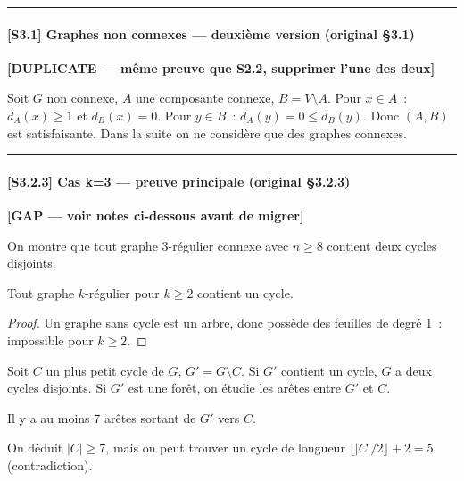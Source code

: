 \bigskip\hrule\bigskip

\paragraph{[S3.1] Graphes non connexes — deuxième version (original §3.1)}
\textbf{[DUPLICATE — même preuve que S2.2, supprimer l'une des deux]}

Soit $G$ non connexe, $A$ une composante connexe, $B = V \setminus A$.
Pour $x \in A$~: $d_A(x) \geq 1$ et $d_B(x) = 0$.
Pour $y \in B$~: $d_A(y) = 0 \leq d_B(y)$.
Donc $(A, B)$ est satisfaisante.
Dans la suite on ne considère que des graphes connexes.

\bigskip\hrule\bigskip


\paragraph{[S3.2.3] Cas k=3 — preuve principale (original §3.2.3)}
\textbf{[GAP — voir notes ci-dessous avant de migrer]}

On montre que tout graphe 3-régulier connexe avec $n \geq 8$ contient deux cycles disjoints.

\begin{proposition}
    Tout graphe $k$-régulier pour $k \geq 2$ contient un cycle.
\end{proposition}
\begin{proof}
    Un graphe sans cycle est un arbre, donc possède des feuilles de degré 1~: impossible pour $k \geq 2$.
\end{proof}

Soit $C$ un plus petit cycle de $G$, $G' = G \setminus C$.
Si $G'$ contient un cycle, $G$ a deux cycles disjoints.
Si $G'$ est une forêt, on étudie les arêtes entre $G'$ et $C$.

\begin{proposition}
    Il y a au moins 7 arêtes sortant de $G'$ vers $C$.
\end{proposition}

On déduit $|C| \geq 7$, mais on peut trouver un cycle de longueur
$\lfloor |C|/2 \rfloor + 2 = 5$ (contradiction).

